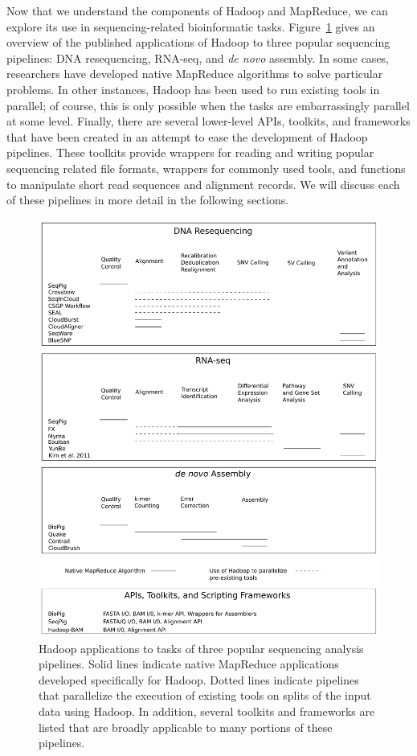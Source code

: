 Now that we understand the components of Hadoop and MapReduce, we can explore its use in sequencing-related bioinformatic tasks. Figure~\ref{bio_hadoop_ecosystem} gives an overview of the published applications of Hadoop to three popular sequencing pipelines: DNA resequencing, RNA-seq, and \emph{de novo} assembly. In some cases, researchers have developed native MapReduce algorithms to solve particular problems. In other instances, Hadoop has been used to run existing tools in parallel; of course, this is only possible when the tasks are embarrassingly parallel at some level. Finally, there are several lower-level APIs, toolkits, and frameworks that have been created in an attempt to ease the development of Hadoop pipelines. These toolkits provide wrappers for reading and writing popular sequencing related file formats, wrappers for commonly used tools, and functions to manipulate short read sequences and alignment records. We will discuss each of these pipelines in more detail in the following sections.

\begin{figure}
\centering
\includegraphics[width=1\textwidth]{figures/bio_hadoop_ecosystem.pdf}
\caption{Hadoop applications to tasks of three popular sequencing analysis pipelines. Solid lines indicate native MapReduce applications developed specifically for Hadoop. Dotted lines indicate pipelines that parallelize the execution of existing tools on splits of the input data using Hadoop. In addition, several toolkits and frameworks are listed that are broadly applicable to many portions of these pipelines.}
\label{bio_hadoop_ecosystem}
\end{figure}

